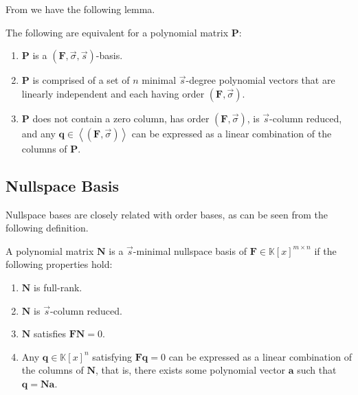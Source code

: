 From \citep{BL1997} we have the following lemma. 
\begin{lem}
\label{lem:orderBasisProperty} 

\label{lem:orderBasisEquivalence}The following are equivalent for
a polynomial matrix \textbf{$\mathbf{P}$}: 
\begin{enumerate}
\item $\mathbf{P}$ is a $\left(\mathbf{F},\vec{\sigma},\vec{s}\right)$-basis. 
\item $\mathbf{P}$ is comprised of a set of $n$ minimal $\vec{s}$-degree
polynomial vectors that are linearly independent and each having order
$\left(\mathbf{F},\vec{\sigma}\right)$. 
\item \label{enu:reduced+generator}$\mathbf{P}$ does not contain a zero
column, has order $\left(\mathbf{F},\vec{\sigma}\right)$, is $\vec{s}$-column
reduced, and any $\mathbf{q}\in\left\langle \left(\mathbf{F},\vec{\sigma}\right)\right\rangle $
can be expressed as a linear combination of the columns of $\mathbf{P}$. 
\end{enumerate}
\end{lem}

\subsection{Nullspace Basis}

Nullspace bases are closely related with order bases, as can be seen
from the following definition.
\begin{defn}
A polynomial matrix $\mathbf{N}$ is a $\vec{s}$-minimal nullspace
basis of $\mathbf{F}\in\mathbb{K}\left[x\right]^{m\times n}$ if the
following properties hold:\end{defn}
\begin{enumerate}
\item $\mathbf{N}$ is full-rank.
\item $\mathbf{N}$ is $\vec{s}$-column reduced. 
\item $\mathbf{N}$ satisfies $\mathbf{F}\mathbf{N}=0$.
\item Any $\mathbf{q}\in\mathbb{K}\left[x\right]^{n}$ satisfying $\mathbf{F}\mathbf{q}=0$
can be expressed as a linear combination of the columns of $\mathbf{N}$,
that is, there exists some polynomial vector $\mathbf{a}$ such that
$\mathbf{q}=\mathbf{N}\mathbf{a}$.
\end{enumerate}
\begin{comment}
Note that the module $\left\langle \left(\mathbf{F},\vec{\sigma}\right)\right\rangle $
does not depend on the shift $\vec{s}$. 
\end{comment}


